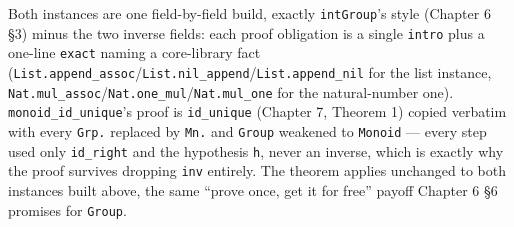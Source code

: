 Both instances are one field-by-field build, exactly \texttt{intGroup}'s style (Chapter 6 §3) minus the two inverse fields: each proof obligation is a single \texttt{intro} plus a one-line \texttt{exact} naming a core-library fact (\texttt{List.append\_\allowbreak{}assoc}/\texttt{List.nil\_\allowbreak{}append}/\texttt{List.append\_\allowbreak{}nil} for the list instance, \texttt{Nat.mul\_\allowbreak{}assoc}/\texttt{Nat.one\_\allowbreak{}mul}/\texttt{Nat.mul\_\allowbreak{}one} for the natural-number one). \texttt{monoid\_\allowbreak{}id\_\allowbreak{}unique}'s proof is \texttt{id\_\allowbreak{}unique} (Chapter 7, Theorem 1) copied verbatim with every \texttt{Grp.} replaced by \texttt{Mn.} and \texttt{Group} weakened to \texttt{Monoid} --- every step used only \texttt{id\_\allowbreak{}right} and the hypothesis \texttt{h}, never an inverse, which is exactly why the proof survives dropping \texttt{inv} entirely. The theorem applies unchanged to both instances built above, the same ``prove once, get it for free'' payoff Chapter 6 §6 promises for \texttt{Group}.
